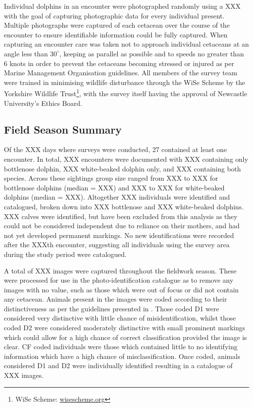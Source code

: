 Individual dolphins in an encounter were photographed randomly using a XXX with the goal of capturing photographic data for every individual present. Multiple photographs were captured of each cetacean over the course of the encounter to ensure identifiable information could be fully captured. When capturing an encounter care was taken not to approach individual cetaceans at an angle less than $30^{\circ}$, keeping as parallel as possible and to speeds no greater than 6 knots in order to prevent the cetaceans becoming stressed or injured as per Marine Management Organisation guidelines. All members of the survey team were trained in minimising wildlife disturbance through the WiSe Scheme by the Yorkshire Wildlife Trust\footnote{WiSe Scheme: \href{https://www.wisescheme.org/}{wisescheme.org}}, with the survey itself having the approval of Newcastle University's Ethics Board.

\subsection{Field Season Summary}\label{ch:NDD,sec:dataCollection,sub:summary}

Of the XXX days where surveys were conducted, 27 contained at least one encounter. In total, XXX encounters were documented with XXX containing only bottlenose dolphin, XXX white-beaked dolphin only, and XXX containing both species. Across these sightings group size ranged from XXX to XXX for bottlenose dolphins (median = XXX) and XXX to XXX for white-beaked dolphins (median = XXX). Altogether XXX individuals were identified and catalogued, broken down into XXX bottlenose and XXX white-beaked dolphins. XXX calves were identified, but have been excluded from this analysis as they could not be considered independent due to reliance on their mothers, and had not yet developed permanent markings. No new identifications were recorded after the XXXth encounter, suggesting all individuals using the survey area during the study period were catalogued. 

A total of XXX images were captured throughout the fieldwork season. These were processed for use in the photo-identification catalogue as to remove any images with no value, such as those which were out of focus or did not contain any cetacean. Animals present in the images were coded according to their distinctiveness as per the guidelines presented in \cite{urian_recommendations_2015}. Those coded D1 were considered very distinctive with little chance of misidentification, whilst those coded D2 were considered moderately distinctive with small prominent markings which could allow for a high chance of correct classification provided the image is clear. CF coded individuals were those which contained little to no identifying information which have a high chance of misclassification. Once coded, animals considered D1 and D2 were individually identified resulting in a catalogue of XXX images. 

